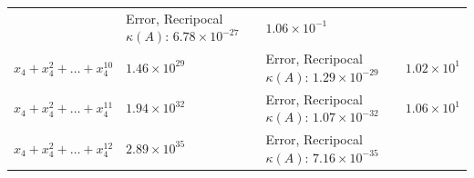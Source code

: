 \documentclass[
]{article}
\begin{document}
\begin{longtable}[]{@{}llll@{}}
\begin{minipage}[t]{0.15\columnwidth}
\end{minipage} & \begin{minipage}[t]{0.36\columnwidth}\raggedright
Error, Recripocal \(\kappa(A)\): \(6.78 \times 10^{-27}\)\strut
\end{minipage} & \begin{minipage}[t]{0.15\columnwidth}\raggedright
\(1.06 \times 10^{-1}\)\strut
\end{minipage}\tabularnewline
\begin{minipage}[t]{0.23\columnwidth}\raggedright
\(x_{4}+x_{4}^{2}+\dots+x_{4}^{10}\)\strut
\end{minipage} & \begin{minipage}[t]{0.15\columnwidth}\raggedright
\(1.46 \times 10^{29}\)\strut
\end{minipage} & \begin{minipage}[t]{0.36\columnwidth}\raggedright
Error, Recripocal \(\kappa(A)\): \(1.29 \times 10^{-29}\)\strut
\end{minipage} & \begin{minipage}[t]{0.15\columnwidth}\raggedright
\(1.02 \times 10^{1}\)\strut
\end{minipage}\tabularnewline
\begin{minipage}[t]{0.23\columnwidth}\raggedright
\(x_{4}+x_{4}^{2}+\dots+x_{4}^{11}\)\strut
\end{minipage} & \begin{minipage}[t]{0.15\columnwidth}\raggedright
\(1.94 \times 10^{32}\)\strut
\end{minipage} & \begin{minipage}[t]{0.36\columnwidth}\raggedright
Error, Recripocal \(\kappa(A)\): \(1.07 \times 10^{-32}\)\strut
\end{minipage} & \begin{minipage}[t]{0.15\columnwidth}\raggedright
\(1.06 \times 10^{1}\)\strut
\end{minipage}\tabularnewline
\begin{minipage}[t]{0.23\columnwidth}\raggedright
\(x_{4}+x_{4}^{2}+\dots+x_{4}^{12}\)\strut
\end{minipage} & \begin{minipage}[t]{0.15\columnwidth}\raggedright
\(2.89 \times 10^{35}\)\strut
\end{minipage} & \begin{minipage}[t]{0.36\columnwidth}\raggedright
Error, Recripocal \(\kappa(A)\): \(7.16 \times 10^{-35}\)\strut
\end{minipage} & \begin{minipage}[t]{0.15\columnwidth}\raggedright

\end{minipage}
\end{longtable}
\end{document}
